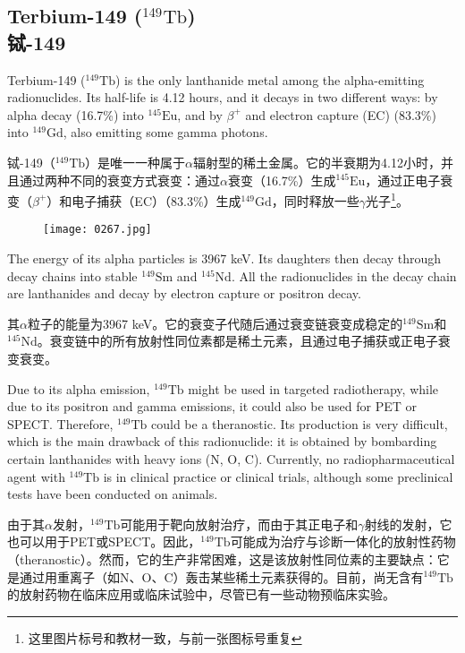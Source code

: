 \documentclass[dvipsnames, svgnames,a4paper,11pt]{article}
\begin{document}
\subsection{Terbium-149 (\(\mathrm{^{149}Tb}\))\\铽-149}  
Terbium-149 (\(\mathrm{^{149}Tb}\)) is the only lanthanide metal among the alpha-emitting radionuclides. Its half-life is 4.12 hours, and it decays in two different ways: by alpha decay (16.7\%) into \(\mathrm{^{145}Eu}\), and by \(\beta^+\) and electron capture (EC) (83.3\%) into \(\mathrm{^{149}Gd}\), also emitting some gamma photons.  
 
铽-149（\(\mathrm{^{149}Tb}\)）是唯一一种属于$\alpha$辐射型的稀土金属。它的半衰期为4.12小时，并且通过两种不同的衰变方式衰变：通过$\alpha$衰变（16.7\%）生成\(\mathrm{^{145}Eu}\)，通过正电子衰变（\(\beta^+\)）和电子捕获（EC）（83.3\%）生成\(\mathrm{^{149}Gd}\)，同时释放一些$\gamma$光子\footnote{这里图片标号和教材一致，与前一张图标号重复}。  

\setcounter{figure}{355}  

\begin{figure}[h]
	\centering
    \texttt{[image: 0267.jpg]}  
     \label{fig356a}
\end{figure}

The energy of its alpha particles is 3967 keV. Its daughters then decay through decay chains into stable \(\mathrm{^{149}Sm}\) and \(\mathrm{^{145}Nd}\). All the radionuclides in the decay chain are lanthanides and decay by electron capture or positron decay.  

其$\alpha$粒子的能量为3967 keV。它的衰变子代随后通过衰变链衰变成稳定的\(\mathrm{^{149}Sm}\)和\(\mathrm{^{145}Nd}\)。衰变链中的所有放射性同位素都是稀土元素，且通过电子捕获或正电子衰变衰变。  

Due to its alpha emission, \(\mathrm{^{149}Tb}\) might be used in targeted radiotherapy, while due to its positron and gamma emissions, it could also be used for PET or SPECT. Therefore, \(\mathrm{^{149}Tb}\) could be a theranostic. Its production is very difficult, which is the main drawback of this radionuclide: it is obtained by bombarding certain lanthanides with heavy ions (N, O, C). Currently, no radiopharmaceutical agent with \(\mathrm{^{149}Tb}\) is in clinical practice or clinical trials, although some preclinical tests have been conducted on animals.

由于其$\alpha$发射，\(\mathrm{^{149}Tb}\)可能用于靶向放射治疗，而由于其正电子和$\gamma$射线的发射，它也可以用于PET或SPECT。因此，\(\mathrm{^{149}Tb}\)可能成为治疗与诊断一体化的放射性药物（theranostic）。然而，它的生产非常困难，这是该放射性同位素的主要缺点：它是通过用重离子（如N、O、C）轰击某些稀土元素获得的。目前，尚无含有\(\mathrm{^{149}Tb}\)的放射药物在临床应用或临床试验中，尽管已有一些动物预临床实验。
\end{document}
